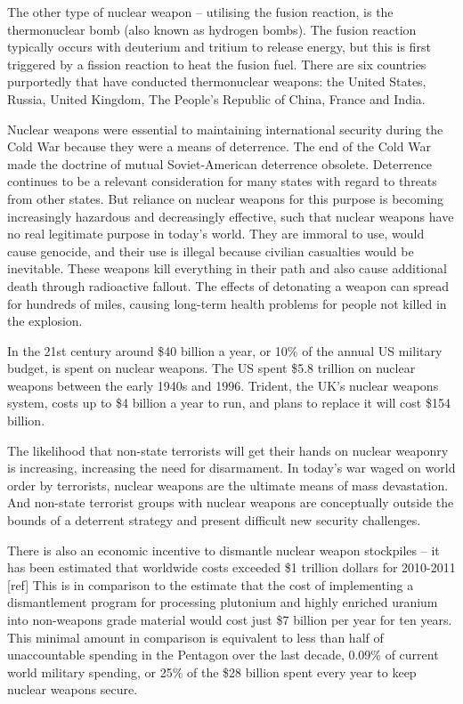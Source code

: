 \documentclass[twoside,titlepage,11pt,twocolumn,a4paper]{article}
\begin{document}
The other type of nuclear weapon -- utilising the fusion reaction, is
the thermonuclear bomb (also known as hydrogen bombs).  The fusion
reaction typically occurs with deuterium and tritium to release
energy, but this is first triggered by a fission reaction to heat the
fusion fuel.  There are six countries purportedly that have conducted
thermonuclear weapons: the United States, Russia, United Kingdom, The
People's Republic of China, France and India.

Nuclear weapons were essential to maintaining international security
during the Cold War because they were a means of deterrence. The end
of the Cold War made the doctrine of mutual Soviet-American deterrence
obsolete.  Deterrence continues to be a relevant consideration for
many states with regard to threats from other states. But reliance on
nuclear weapons for this purpose is becoming increasingly hazardous
and decreasingly effective, such that nuclear weapons have no real
legitimate purpose in today’s world.  They are immoral to use, would
cause genocide, and their use is illegal because civilian casualties
would be inevitable. These weapons kill everything in their path and
also cause additional death through radioactive fallout. The effects
of detonating a weapon can spread for hundreds of miles, causing
long-term health problems for people not killed in the explosion.

In the 21st century around \$40 billion a year, or 10\% of the annual
US military budget, is spent on nuclear weapons. The US spent \$5.8
trillion on nuclear weapons between the early 1940s and 1996. Trident,
the UK’s nuclear weapons system, costs up to \$4 billion a year to
run, and plans to replace it will cost \$154 billion.

The likelihood that non-state terrorists will get their hands on
nuclear weaponry is increasing, increasing the need for
disarmament. In today's war waged on world order by terrorists,
nuclear weapons are the ultimate means of mass devastation. And
non-state terrorist groups with nuclear weapons are conceptually
outside the bounds of a deterrent strategy and present difficult new
security challenges.

There is also an economic incentive to dismantle nuclear weapon
stockpiles -- it has been estimated that worldwide costs exceeded \$1
trillion dollars for 2010-2011 [ref] This is in comparison to the
estimate that the cost of implementing a dismantlement program for
processing plutonium and highly enriched uranium into non-weapons
grade material would cost just \$7 billion per year for ten
years. This minimal amount in comparison is equivalent to less than
half of unaccountable spending in the Pentagon over the last decade,
0.09\% of current world military spending, or 25\% of the \$28 billion
spent every year to keep nuclear weapons secure.
\end{document}
